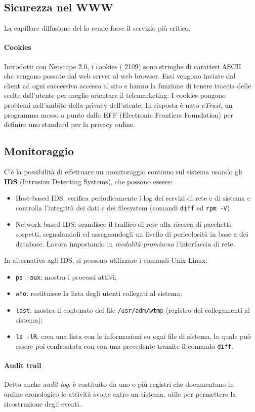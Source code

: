 \documentclass[a4paper,11pt]{article}
\def\code#1{\texttt{#1}}
\def\sub#1{\subsection{#1}\label{#1}}
\def\para#1{\paragraph{#1}\label{#1}}
\def\vedi#1{\nameref{#1}}
\begin{document}
\sub{Sicurezza nel WWW}
La capillare diffusione del \vedi{WWW} lo rende forse il servizio più critico. 
\para{Cookies} Introdotti con Netscape 2.0, i cookies (\vedi{RFC} 2109) sono stringhe di caratteri ASCII che vengono passate dal web server al web browser. Essi vengono inviate dal client ad ogni successivo accesso al sito e hanno la funzione di tenere traccia delle scelte dell'utente per meglio orientare il telemarketing. I cookies pongono problemi nell'ambito della privacy dell'utente. In risposta è nato \textit{eTrust}, un programma messo a punto dalla EFF (Electronic Frontiers Foundation) per definire uno standard per la privacy online.
\sub{Monitoraggio} C'è la possibilità di effettuare un monitoraggio continuo sul sistema usando gli \textbf{IDS} (Intrusion Detecting Systems), che possono essere:
\begin{itemize}
\item Host-based IDS: verifica periodicamente i log dei servizi di rete e di sistema e controlla l'integrità dei dati e dei filesystem (comandi \code{diff} ed \code{rpm -V})
\item Network-based IDS: scandisce il traffico di rete alla ricerca di pacchetti sospetti, segnalandoli ed assegnandogli un
livello di pericolosità in base a dei database. Lavora impostando in \textit{modalità promiscua} l'interfaccia di rete.
\end{itemize}
In alternativa agli IDS, si possono utilizzare i comandi Unix-Linux:
\begin{itemize}
\item \code{ps -aux}: mostra i processi attivi;
\item \code{who}: restituisce la lista degli utenti collegati al sistema;
\item \code{last}: mostra il contenuto del file \code{/usr/adm/wtmp} (registro dei collegamenti al sistema);
\item \code{ls -lR}: crea una lista con le informazioni su ogni file di sistema, la quale può essere poi confrontata con con una precedente tramite il comando \code{diff}.
\end{itemize}
\paragraph{Audit trail} 
Detto anche \textit{audit log}, è costituito da uno o più registri che documentano in ordine cronologico le attività svolte entro un sistema, utile per permettere la ricostruzione degli eventi.
\end{document}
